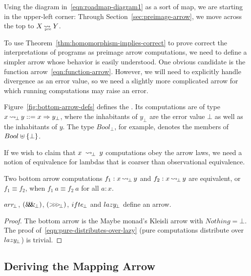 \documentclass[preprint]{sigplanconf}
\newcommand{\arrow}{\rightsquigarrow}
\newcommand{\arrowarr}{\ensuremath{arr}}
\newcommand{\arrowcomp}{\ensuremath{{>}\mspace{-6mu}{>}\mspace{-6mu}{>}}}
\newcommand{\arrowpair}{\ensuremath{\mathit{\&\mspace{-7.5mu}\&\mspace{-7.5mu}\&}}}
\newcommand{\arrowif}{\ensuremath{ifte}}
\newcommand{\arrowlazy}{\ensuremath{lazy}}
\DeclareMathOperator{\botto}{\arrow_{\mspace{-3mu}\bot}}
\newcommand{\arrbot}{\arrowarr_{\mspace{-3mu}\bot}}
\newcommand{\compbot}{\arrowcomp_{\mspace{-5mu}\bot}}
\newcommand{\pairbot}{\arrowpair_{\mspace{-3mu}\bot}}
\newcommand{\ifbot}{\arrowif_{\mspace{-2mu}\bot}}
\newcommand{\lazybot}{\arrowlazy_{\mspace{-2mu}\bot}}
\newcommand{\pre}{_\mathrm{pre}}
\DeclareMathOperator{\preto}{\arrow_{\mspace{-19mu}\pre}}
\begin{document}
Using the diagram in~\eqref{eqn:roadmap-diagram1} as a sort of map, we are starting in the upper-left corner:
Through Section~\ref{sec:preimage-arrow}, we move across the top to $X \preto Y$.

To use Theorem~\ref{thm:homomorphism-implies-correct} to prove correct the interpretations of programs as preimage arrow computations, we need to define a simpler arrow whose behavior is easily understood.
One obvious candidate is the function arrow~\eqref{eqn:function-arrow}.
However, we will need to explicitly handle divergence as an error value, so we need a slightly more complicated arrow for which running computations may raise an error.

Figure~\ref{fig:bottom-arrow-defs} defines the .
Its computations are of type $x \botto y ::= x \tto y_\bot$, where the inhabitants of $y_\bot$ are the error value $\bot$ as well as the inhabitants of $y$.
The type $Bool_\bot$, for example, denotes the members of $Bool \uplus \{{\bot}\}$.

If we wish to claim that $x~\botto~y$ computations obey the arrow laws, we need a notion of equivalence for lambdas that is coarser than observational equivalence.
\begin{definition}
Two bottom arrow computations $f_1 : x \botto y$ and $f_2 : x \botto y$ are equivalent, or $f_1 \equiv f_2$, when $f_1~a \equiv f_2~a$ for all $a : x$.
\end{definition}

\begin{theorem}
$\arrbot$, $(\pairbot)$, $(\compbot)$, $\ifbot$ and $\lazybot$ define an arrow.
\end{theorem}
\begin{proof}
The bottom arrow is the Maybe monad's Kleisli arrow with $Nothing = \bot$.
The proof of~\eqref{eqn:pure-distributes-over-lazy} (pure computations distribute over $\lazybot$) is trivial.
\end{proof}

\subsection{Deriving the Mapping Arrow}
\end{document}
